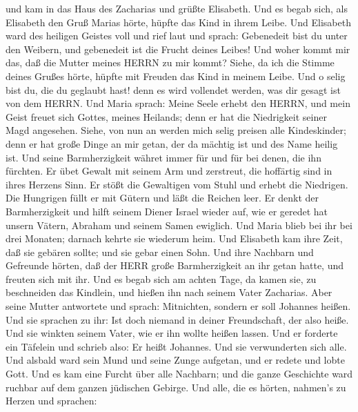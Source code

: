  und kam in das Haus des Zacharias und grüßte Elisabeth.
 Und es begab sich, als Elisabeth den Gruß Marias hörte,
hüpfte das Kind in ihrem Leibe. Und Elisabeth ward des heiligen Geistes
voll  und rief laut und sprach: Gebenedeit bist du unter
den Weibern, und gebenedeit ist die Frucht deines Leibes! 
Und woher kommt mir das, daß die Mutter meines HERRN zu mir kommt?
 Siehe, da ich die Stimme deines Grußes hörte, hüpfte mit
Freuden das Kind in meinem Leibe.  Und o selig bist du, die
du geglaubt hast! denn es wird vollendet werden, was dir gesagt ist von
dem HERRN.  Und Maria sprach: Meine Seele erhebt den HERRN,
 und mein Geist freuet sich Gottes, meines Heilands;
 denn er hat die Niedrigkeit seiner Magd angesehen. Siehe,
von nun an werden mich selig preisen alle Kindeskinder; 
denn er hat große Dinge an mir getan, der da mächtig ist und des Name
heilig ist.  Und seine Barmherzigkeit währet immer für und
für bei denen, die ihn fürchten.  Er übet Gewalt mit seinem
Arm und zerstreut, die hoffärtig sind in ihres Herzens Sinn.
 Er stößt die Gewaltigen vom Stuhl und erhebt die
Niedrigen.  Die Hungrigen füllt er mit Gütern und läßt die
Reichen leer.  Er denkt der Barmherzigkeit und hilft seinem
Diener Israel wieder auf,  wie er geredet hat unsern
Vätern, Abraham und seinem Samen ewiglich.  Und Maria blieb
bei ihr bei drei Monaten; darnach kehrte sie wiederum heim.
 Und Elisabeth kam ihre Zeit, daß sie gebären sollte; und
sie gebar einen Sohn.  Und ihre Nachbarn und Gefreunde
hörten, daß der HERR große Barmherzigkeit an ihr getan hatte, und
freuten sich mit ihr.  Und es begab sich am achten Tage, da
kamen sie, zu beschneiden das Kindlein, und hießen ihn nach seinem Vater
Zacharias.  Aber seine Mutter antwortete und sprach:
Mitnichten, sondern er soll Johannes heißen.  Und sie
sprachen zu ihr: Ist doch niemand in deiner Freundschaft, der also
heiße.  Und sie winkten seinem Vater, wie er ihn wollte
heißen lassen.  Und er forderte ein Täfelein und schrieb
also: Er heißt Johannes. Und sie verwunderten sich alle. 
Und alsbald ward sein Mund und seine Zunge aufgetan, und er redete und
lobte Gott.  Und es kam eine Furcht über alle Nachbarn; und
die ganze Geschichte ward ruchbar auf dem ganzen jüdischen Gebirge.
 Und alle, die es hörten, nahmen's zu Herzen und sprachen:
